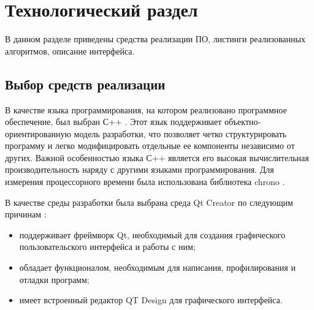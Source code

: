 \chapter{Технологический раздел}
В данном разделе приведены средства реализации ПО, листинги реализованных алгоритмов, описание интерфейса.

\section{Выбор средств реализации}
В качестве языка программирования, на котором реализовано программное обеспечение, был выбран С++ \cite{c++}. Этот язык поддерживает объектно-ориентированную модель разработки, что позволяет четко структурировать программу и легко модифицировать отдельные ее компоненты независимо от других. Важной особенностью языка С++ является его высокая вычислительная производительность наряду с другими языками программирования. Для измерения процессорного времени была использована библиотека chrono \cite{chrono}.

В качестве среды разработки была выбрана среда Qt Creator по следующим причинам \cite{qt}:
\begin{itemize}
	\item поддерживает фреймворк Qt, необходимый для создания графического пользовательского интерфейса и работы с ним;
	\item обладает функционалом, необходимым для написания, профилирования и отладки программ;
	\item имеет встроенный редактор QT Design для графического интерфейса.
\end{itemize}

